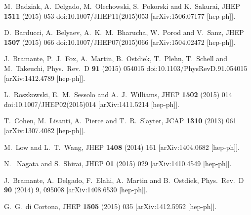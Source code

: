 \documentclass[12pt,twoside]{article}
\begin{document}
\begin{thebibliography}{99}
  M.~Badziak, A.~Delgado, M.~Olechowski, S.~Pokorski and K.~Sakurai,
  JHEP {\bf 1511} (2015) 053
  doi:10.1007/JHEP11(2015)053
  [arXiv:1506.07177 [hep-ph]].

  D.~Barducci, A.~Belyaev, A.~K.~M.~Bharucha, W.~Porod and V.~Sanz,
  JHEP {\bf 1507} (2015) 066
  doi:10.1007/JHEP07(2015)066
  [arXiv:1504.02472 [hep-ph]].
  
  J.~Bramante, P.~J.~Fox, A.~Martin, B.~Ostdiek, T.~Plehn, T.~Schell and M.~Takeuchi,
  Phys.\ Rev.\ D {\bf 91} (2015) 054015
  doi:10.1103/PhysRevD.91.054015
  [arXiv:1412.4789 [hep-ph]].
  
  L.~Roszkowski, E.~M.~Sessolo and A.~J.~Williams,
  JHEP {\bf 1502} (2015) 014
  doi:10.1007/JHEP02(2015)014
  [arXiv:1411.5214 [hep-ph]].
  

  
  
  T.~Cohen, M.~Lisanti, A.~Pierce and T.~R.~Slayter,
  JCAP  {\bf 1310} (2013) 061
  [arXiv:1307.4082 [hep-ph]].
  
  M.~Low and L.~T.~Wang,
  JHEP {\bf 1408} (2014) 161
  [arXiv:1404.0682 [hep-ph]].
  
  N.~ Nagata and S.~Shirai,
  JHEP {\bf 01} (2015) 029
  [arXiv:1410.4549 [hep-ph]].
    

  J.~Bramante, A.~Delgado, F.~Elahi, A.~Martin and B.~Ostdiek,
  Phys.\ Rev.\ D {\bf 90} (2014) 9,  095008
  [arXiv:1408.6530 [hep-ph]].
  
  G.~G.~di Cortona,
  JHEP {\bf 1505} (2015) 035
  [arXiv:1412.5952 [hep-ph]].
  

\end{thebibliography}
\end{document}
